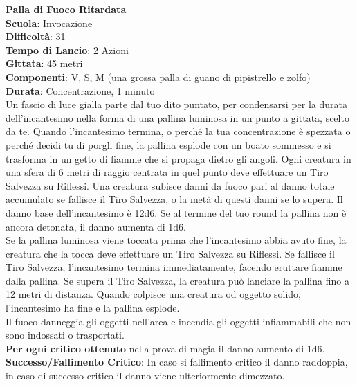 \begin{multicols}{2}
\medskip\textbf{Palla di Fuoco Ritardata}\\
\textbf{Scuola}: Invocazione\\
\textbf{Difficoltà}: 31\\
\textbf{Tempo di Lancio}: 2 Azioni\\
\textbf{Gittata}: 45 metri\\
\textbf{Componenti}: V, S, M (una grossa palla di guano di pipistrello e zolfo)\\
\textbf{Durata}: Concentrazione, 1 minuto\\
Un fascio di luce gialla parte dal tuo dito puntato, per condensarsi per la durata dell'incantesimo nella forma di una pallina luminosa in un punto a gittata, scelto da te. Quando l'incantesimo termina, o perché la tua concentrazione è spezzata o perché decidi tu di porgli fine, la pallina esplode con un boato sommesso e si trasforma in un getto di fiamme che si propaga dietro gli angoli. Ogni creatura in una sfera di 6 metri di raggio centrata in quel punto deve effettuare un Tiro Salvezza su Riflessi. Una creatura subisce danni da fuoco pari al danno totale accumulato se fallisce il Tiro Salvezza, o la metà di questi danni se lo supera. Il danno base dell'incantesimo è 12d6. Se al termine del tuo round la pallina non è ancora detonata, il danno aumenta di 1d6.\\
Se la pallina luminosa viene toccata prima che l'incantesimo abbia avuto fine, la creatura che la tocca deve effettuare un Tiro Salvezza su Riflessi. Se fallisce il Tiro Salvezza, l'incantesimo termina immediatamente, facendo eruttare fiamme dalla pallina. Se supera il Tiro Salvezza, la creatura può lanciare la pallina fino a 12 metri di distanza. Quando colpisce una creatura od oggetto solido, l'incantesimo ha fine e la pallina esplode.\\
Il fuoco danneggia gli oggetti nell'area e incendia gli oggetti infiammabili che non sono indossati o trasportati.\\
\textbf{Per ogni critico ottenuto} nella prova di magia il danno aumento di 1d6.\\
\textbf{Successo/Fallimento Critico}: In caso si fallimento critico il danno raddoppia, in caso di successo critico il danno viene ulteriormente dimezzato.


\end{multicols}
